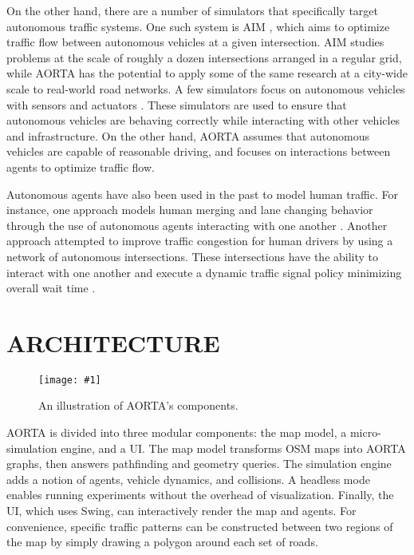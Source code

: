 \documentclass[letterpaper, 10 pt, conference]{ieeeconf}  %
\newcommand{\pix}[3]{
  \begin{figure}[h]
    \centering \texttt{[image: \#1]}
    \caption{#2}
  \end{figure}
}
\begin{document}
On the other hand, there are a number of simulators that specifically
target autonomous traffic systems. One such system is AIM
\cite{JAIR08-dresner}, which aims to optimize traffic flow between
autonomous vehicles at a given intersection. AIM studies problems at
the scale of roughly a dozen intersections arranged in a regular grid,
while AORTA has the potential to apply some of the same research at a
city-wide scale to real-world road networks. A few simulators focus on
autonomous vehicles with sensors and actuators
\cite{figueiredo2009approach}. These simulators are used to ensure
that autonomous vehicles are behaving correctly while interacting with
other vehicles and infrastructure. On the other hand, AORTA assumes
that autonomous vehicles are capable of reasonable driving, and
focuses on interactions between agents to optimize traffic flow.

Autonomous agents have also been used in the past to model human
traffic. For instance, one approach models human merging and lane
changing behavior through the use of autonomous agents interacting
with one another \cite{hidas2002modelling}. Another approach attempted
to improve traffic congestion for human drivers by using a network of
autonomous intersections.  These intersections have the ability to
interact with one another and execute a dynamic traffic signal policy
minimizing overall wait time \cite{manikonda2001autonomous}.



\section{ARCHITECTURE}


\pix{architecture.pdf}{An illustration of AORTA's components.}{scale=0.3}

AORTA is divided into three modular components: the map model, a
micro-simulation engine, and a UI. The map model transforms OSM maps into AORTA
graphs, then answers pathfinding and geometry queries. The simulation engine
adds a notion of agents, vehicle dynamics, and collisions. A headless mode
enables running experiments without the overhead of visualization. Finally, the
UI, which uses Swing, can interactively render the map and agents. For
convenience, specific traffic patterns can be constructed between two regions of
the map by simply drawing a polygon around each set of roads.
\end{document}
